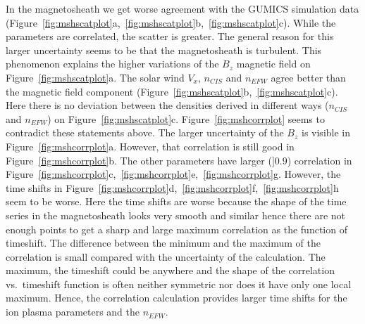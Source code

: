 \documentclass[b5paper,10pt]{article}
\begin{document}
In the magnetosheath we get worse agreement with the GUMICS simulation data (Figure~\ref{fig:mshscatplot}a,~\ref{fig:mshscatplot}b,~\ref{fig:mshscatplot}c). While the parameters are correlated, the scatter is greater. The general reason for this larger uncertainty seems to be that the magnetosheath is turbulent. This phenomenon explains the higher variations of the $B_{z}$ magnetic field on Figure~\ref{fig:mshscatplot}a. The solar wind $V_{x}$, $n_{CIS}$ and $n_{EFW}$ agree better than the magnetic field component (Figure~\ref{fig:mshscatplot}b,~\ref{fig:mshscatplot}c). Here there is no deviation between the densities derived in different ways ($n_{CIS}$ and $n_{EFW}$) on Figure~\ref{fig:mshscatplot}c. Figure~\ref{fig:mshcorrplot} seems to contradict these statements above. The larger uncertainty of the $B_{z}$ is visible in Figure~\ref{fig:mshcorrplot}a. However, that correlation is still good in Figure~\ref{fig:mshcorrplot}b. The other parameters have larger ($]0.9$) correlation in Figure~\ref{fig:mshcorrplot}c,~\ref{fig:mshcorrplot}e,~\ref{fig:mshcorrplot}g. However, the time shifts in Figure~\ref{fig:mshcorrplot}d,~\ref{fig:mshcorrplot}f,~\ref{fig:mshcorrplot}h seem to be worse. Here the time shifts are worse because the shape of the time series in the magnetosheath looks very smooth and similar hence there are not enough points to get a sharp and large maximum correlation as the function of timeshift. The difference between the minimum and the maximum of the correlation is small compared with the uncertainty of the calculation. The maximum, the timeshift could be anywhere and the shape of the correlation vs.~timeshift function is often neither symmetric nor does it have only one local maximum. Hence, the correlation calculation provides larger time shifts for the ion plasma parameters and the $n_{EFW}$. 
\end{document}
